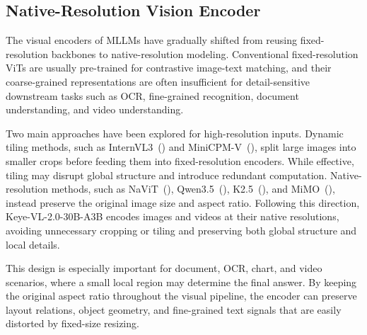 \documentclass{llmxive}
\begin{document}

\subsection{Native-Resolution Vision Encoder}

The visual encoders of MLLMs have gradually shifted from reusing fixed-resolution backbones to native-resolution modeling. Conventional fixed-resolution ViTs are usually pre-trained for contrastive image-text matching, and their coarse-grained representations are often insufficient for detail-sensitive downstream tasks such as OCR, fine-grained recognition, document understanding, and video understanding.

Two main approaches have been explored for high-resolution inputs. Dynamic tiling methods, such as InternVL3~(\cite{internvl3}) and MiniCPM-V~(\cite{minicpm_v}), split large images into smaller crops before feeding them into fixed-resolution encoders. While effective, tiling may disrupt global structure and introduce redundant computation. Native-resolution methods, such as NaViT~(\cite{navit}), Qwen3.5~(\cite{qwen3.5}), K2.5~(\cite{team2026kimi}), and MiMO~(\cite{mimoteam2026v2flash}), instead preserve the original image size and aspect ratio. Following this direction, Keye-VL-2.0-30B-A3B encodes images and videos at their native resolutions, avoiding unnecessary cropping or tiling and preserving both global structure and local details.

This design is especially important for document, OCR, chart, and video scenarios, where a small local region may determine the final answer. By keeping the original aspect ratio throughout the visual pipeline, the encoder can preserve layout relations, object geometry, and fine-grained text signals that are easily distorted by fixed-size resizing.
\end{document}
